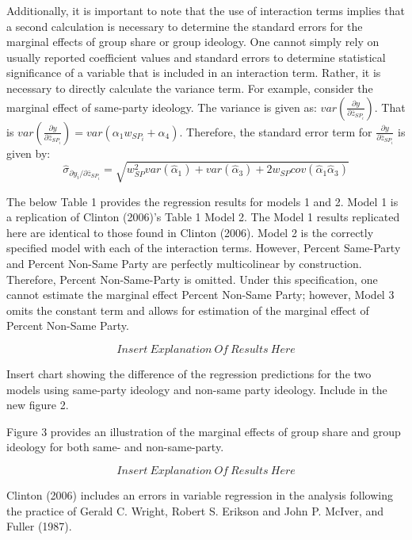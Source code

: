 \documentclass[10pt,letterpaper]{article}
\begin{document}
Additionally, it is important to note that the use of interaction terms implies that a second calculation is necessary to determine the standard errors for the marginal effects of group share or group ideology. One cannot simply rely on usually reported coefficient values and standard errors to determine statistical significance of a variable that is included in an interaction term. Rather, it is necessary to directly calculate the variance term. For example, consider the marginal effect of same-party ideology. The variance is given as:  $var(\frac{\partial y}{\partial \bar{z}_{SP_i}})$. That is $var(\frac{\partial y}{\partial \bar{z}_{SP_i}}) = var(\alpha_1 w_{SP_i} + \alpha_4)$. Therefore, the standard error term for $\frac{\partial y}{\partial \bar{z}_{SP_i}}$ is given by:
$$\hat{\sigma}_{\partial y_i / \partial \bar{z}_{SP_i}} = \sqrt{w_{SP}^2var(\hat{\alpha}_1)+var(\hat{\alpha}_3)+2w_{SP}cov(\hat{\alpha}_1\hat{\alpha}_3)}$$

The below Table 1 provides the regression results for models 1 and 2. Model 1 is a replication of Clinton (2006)'s Table 1 Model 2. The Model 1 results replicated here are identical to those found in Clinton (2006). Model 2 is the correctly specified model with each of the interaction terms. However, Percent Same-Party and Percent Non-Same Party are perfectly multicolinear by construction. Therefore, Percent Non-Same-Party is omitted. Under this specification, one cannot estimate the marginal effect Percent Non-Same Party; however, Model 3 omits the constant term and allows for estimation of the marginal effect of Percent Non-Same Party.

$$Insert ~ Explanation~Of~Results~Here$$

Insert chart showing the difference of the regression predictions for the two models using same-party ideology and non-same party ideology. Include in the new figure 2.

Figure 3 provides an illustration of the marginal effects of group share and group ideology for both same- and non-same-party.

$$Insert ~ Explanation~Of~Results~Here$$




 

 

Clinton (2006) includes an errors in variable regression in the analysis following the practice of Gerald C. Wright, Robert S. Erikson and John P. McIver, and Fuller (1987).
\end{document}
